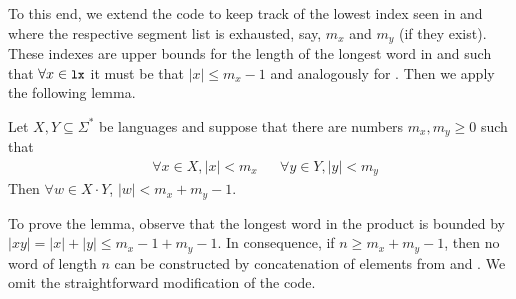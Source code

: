 To this end, we extend the code to keep track of the lowest index
seen in  and  where the respective segment list is
exhausted, say, $m_x$ and $m_y$ (if they exist). These indexes
are upper bounds for the length of the longest word in  and
 such that $\forall x \in \code{lx}$ it must be that
$|x|\le m_x-1$ and analogously for . Then we apply the
following lemma.
\begin{lemma}
  Let $X, Y \subseteq \Sigma^*$ be languages and suppose that there
  are numbers $m_x, m_y \ge 0$ such that
  \begin{align*}
    & \forall x \in X, |x| < m_x
    && \forall y \in Y, |y| < m_y
  \end{align*}
  Then $\forall w\in X\cdot Y$, $|w| < m_x + m_y -1$.
\end{lemma}
To prove the lemma, observe that the longest word in
the product is bounded by $|xy| = |x| + |y| \le m_x -1 + m_y -1$. In
consequence, if $n \ge m_x + m_y - 1$, then no word of
length $n$ can be constructed by concatenation of elements from
 and
.
We omit the straightforward modification of the code.

